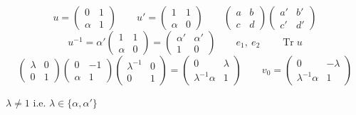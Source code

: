 \documentclass[11pt,a4paper]{article}
\begin{document}
\[
u = \begin{pmatrix} 0 & 1 \\ \alpha & 1 \end{pmatrix}
\qquad
u' = \begin{pmatrix} 1 & 1 \\ \alpha & 0 \end{pmatrix}
\qquad
\begin{pmatrix} a & b \\ c & d \end{pmatrix}
\begin{pmatrix} a' & b' \\ c' & d' \end{pmatrix}
\]
\[
u^{-1} = \alpha' \begin{pmatrix} 1 & 1 \\ \alpha & 0 \end{pmatrix}
= \begin{pmatrix} \alpha' & \alpha' \\ 1 & 0 \end{pmatrix}
\qquad e_1, \ e_2 \qquad \operatorname{Tr} u
\]
\[
\begin{pmatrix} \lambda & 0 \\ 0 & 1 \end{pmatrix}
\begin{pmatrix} 0 & -1 \\ \alpha & 1 \end{pmatrix}
\begin{pmatrix} \lambda^{-1} & 0 \\ 0 & 1 \end{pmatrix}
=
\begin{pmatrix} 0 & \lambda \\ \lambda^{-1}\alpha & 1 \end{pmatrix}
\qquad
v_0 = \begin{pmatrix} 0 & -\lambda \\ \lambda^{-1}\alpha & 1 \end{pmatrix}
\]

$\lambda \neq 1$ \quad i.e. $\lambda \in \{\alpha, \alpha'\}$
\end{document}
